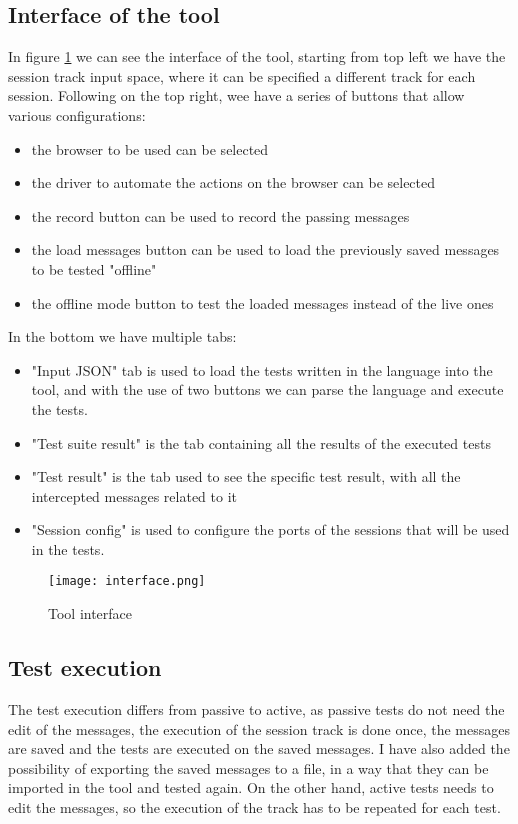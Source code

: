 \subsection{Interface of the tool}
In figure \ref{fig:plugin_interface} we can see the interface of the tool, starting from top left we have the session track input space, where it can be specified a different track for each session. Following on the top right, wee have a series of buttons that allow various configurations:
\begin{itemize}
    \item the browser to be used can be selected
    \item the driver to automate the actions on the browser can be selected
    \item the record button can be used to record the passing messages
    \item the load messages button can be used to load the previously saved messages to be tested "offline"
    \item the offline mode button to test the loaded messages instead of the live ones
\end{itemize}

In the bottom we have multiple tabs:
\begin{itemize}
    \item "Input JSON" tab is used to load the tests written in the language into the tool, and with the use of two buttons we can parse the language and execute the tests.
    \item "Test suite result" is the tab containing all the results of the executed tests
    \item "Test result" is the tab used to see the specific test result, with all the intercepted messages related to it
    \item "Session config" is used to configure the ports of the sessions that will be used in the tests.
\end{itemize}

\begin{figure}
    \texttt{[image: interface.png]}
    \caption{Tool interface}
    \label{fig:plugin_interface}
\end{figure}

\subsection{Test execution}
The test execution differs from passive to active, as passive tests do not need the edit of the messages, the execution of the \gls{session track} is done once, the messages are saved and the tests are executed on the saved messages. I have also added the possibility of exporting the saved messages to a file, in a way that they can be imported in the tool and tested again.
On the other hand, active tests needs to edit the messages, so the execution of the track has to be repeated for each test.

